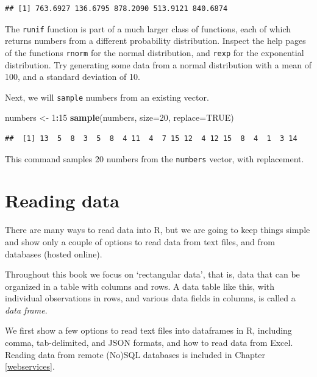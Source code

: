 \documentclass[]{book}
\newenvironment{Shaded}{\begin{snugshade}}{\end{snugshade}}
\newcommand{\DataTypeTok}[1]{\textcolor[rgb]{0.13,0.29,0.53}{#1}}
\newcommand{\DecValTok}[1]{\textcolor[rgb]{0.00,0.00,0.81}{#1}}
\newcommand{\KeywordTok}[1]{\textcolor[rgb]{0.13,0.29,0.53}{\textbf{#1}}}
\newcommand{\NormalTok}[1]{#1}
\newcommand{\OperatorTok}[1]{\textcolor[rgb]{0.81,0.36,0.00}{\textbf{#1}}}
\newcommand{\OtherTok}[1]{\textcolor[rgb]{0.56,0.35,0.01}{#1}}
\newcommand{\StringTok}[1]{\textcolor[rgb]{0.31,0.60,0.02}{#1}}
\let\BeginKnitrBlock\begin \let\EndKnitrBlock\end
\begin{document}
\begin{verbatim}
## [1] 763.6927 136.6795 878.2090 513.9121 840.6874
\end{verbatim}

\BeginKnitrBlock{rmdtry}
The \texttt{runif} function is part of a much larger class of functions, each of which returns
numbers from a different probability distribution. Inspect the help pages of the functions \texttt{rnorm}
for the normal distribution, and \texttt{rexp} for the exponential distribution. Try generating some data from a normal distribution with a mean of 100, and a standard deviation of 10.
\EndKnitrBlock{rmdtry}

Next, we will \texttt{sample} numbers from an existing vector.

\begin{Shaded}
\begin{Highlighting}[]
\NormalTok{numbers <-}\StringTok{ }\DecValTok{1}\OperatorTok{:}\DecValTok{15}
\KeywordTok{sample}\NormalTok{(numbers, }\DataTypeTok{size=}\DecValTok{20}\NormalTok{, }\DataTypeTok{replace=}\OtherTok{TRUE}\NormalTok{)}
\end{Highlighting}
\end{Shaded}

\begin{verbatim}
##  [1] 13  5  8  3  5  8  4 11  4  7 15 12  4 12 15  8  4  1  3 14
\end{verbatim}

This command samples 20 numbers from the \texttt{numbers} vector, with replacement.

\hypertarget{readingdata}{%
\section{Reading data}\label{readingdata}}

There are many ways to read data into R, but we are going to keep things simple and show only a couple of options to read data from text files, and from databases (hosted online).

Throughout this book we focus on `rectangular data', that is, data that can be organized in a table with columns and rows. A data table like this, with individual observations in rows, and various data fields in columns, is called a \emph{data frame}.

We first show a few options to read text files into dataframes in R, including comma, tab-delimited, and JSON formats, and how to read data from Excel. Reading data from remote (No)SQL databases is included in Chapter \ref{webservices}.
\end{document}
